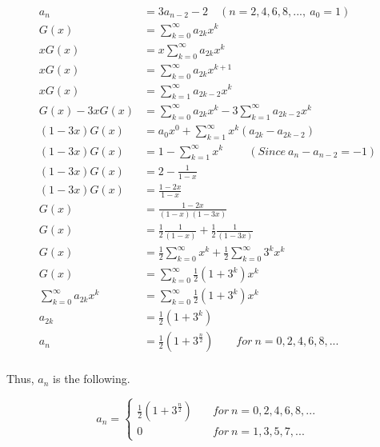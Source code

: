 \documentclass[12pt]{article}
\begin{document}
\begin{enumerate}
\begin{equation*}
    \begin{split}
        a_n & = 3a_{n-2}-2 \quad (n = 2,4,6,8,..., \ a_0 = 1) \\
        G(x) & = \sum_{k = 0}^{\infty}{a_{2k}x^k}\\
        xG(x) & = x\sum_{k = 0}^{\infty}{a_{2k}x^k}\\
        xG(x) & = \sum_{k = 0}^{\infty}{a_{2k}x^{k+1}}\\
        xG(x) & = \sum_{k = 1}^{\infty}{a_{2k-2}x^k}\\
        G(x) - 3xG(x) & = \sum_{k = 0}^{\infty}{a_{2k}x^k} - 3 \sum_{k = 1}^{\infty}{a_{2k-2}x^k}\\
        (1-3x)G(x) & = a_0x^0 + \sum_{k = 1}^{\infty}{x^k(a_{2k}-a_{2k-2})}\\
        (1-3x)G(x) & = 1 - \sum_{k = 1}^{\infty}{x^k} \qquad \ (Since \ a_n - a_{n-2} = -1)\\
        (1-3x)G(x) & = 2 - \frac{1}{1-x}\\
        (1-3x)G(x) & = \frac{1-2x}{1-x}\\
        G(x) & = \frac{1-2x}{(1-x)(1-3x)}\\
        G(x) & = \frac{1}{2}\frac{1}{(1-x)}+\frac{1}{2}\frac{1}{(1-3x)}\\
        G(x) & = \frac{1}{2}\sum_{k=0}^{\infty}{x^k}+\frac{1}{2}\sum_{k=0}^{\infty}{3^kx^k}\\
        G(x) & = \sum_{k=0}^{\infty}{\frac{1}{2}(1+3^k)x^k}\\
        \sum_{k = 0}^{\infty}{a_{2k}x^k} & = \sum_{k=0}^{\infty}{\frac{1}{2}(1+3^k)x^k}\\
        a_{2k} & = \frac{1}{2}(1+3^k)\\
        a_{n} & = \frac{1}{2}(1+3^{\frac{n}{2}}) \qquad for \ n = 0,2,4,6,8,...\\
    \end{split}
\end{equation*}

Thus, $a_n$ is the following.

$$
a_n = \left\{
        \begin{array}{ll}
            \frac{1}{2}(1+3^{\frac{n}{2}}) & \quad for \ n = 0,2,4,6,8,...\\
            0 & \quad for \ n = 1,3,5,7,...
        \end{array}
    \right.
$$


\end{enumerate}
\end{document}
